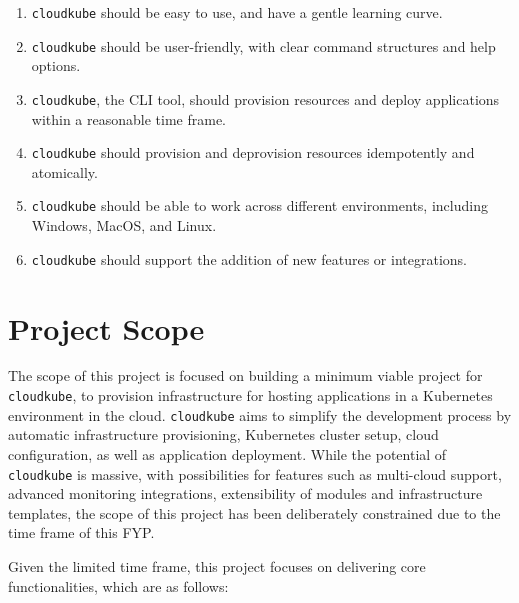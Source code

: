 \begin{enumerate}[label=\alph*., itemsep=0pt]
    \item \texttt{cloudkube} should be easy to use, and have a gentle learning curve.
    \item \texttt{cloudkube} should be user-friendly, with clear command structures and help options.
    \item \texttt{cloudkube}, the CLI tool, should provision resources and deploy applications within a reasonable time frame.
    \item \texttt{cloudkube} should provision and deprovision resources idempotently and atomically.
    \item \texttt{cloudkube} should be able to work across different environments, including Windows, MacOS, and Linux.
    \item \texttt{cloudkube} should support the addition of new features or integrations.
\end{enumerate}

\section{Project Scope}

The scope of this project is focused on building a minimum viable project for \texttt{cloudkube}, to provision infrastructure for hosting applications in a Kubernetes environment in the cloud. \texttt{cloudkube} aims to simplify the development process by automatic infrastructure provisioning, Kubernetes cluster setup, cloud configuration, as well as application deployment. While the potential of \texttt{cloudkube} is massive, with possibilities for features such as multi-cloud support, advanced monitoring integrations, extensibility of modules and infrastructure templates, the scope of this project has been deliberately constrained due to the time frame of this FYP.  

Given the limited time frame, this project focuses on delivering core functionalities, which are as follows:

\vspace{-1em} %

